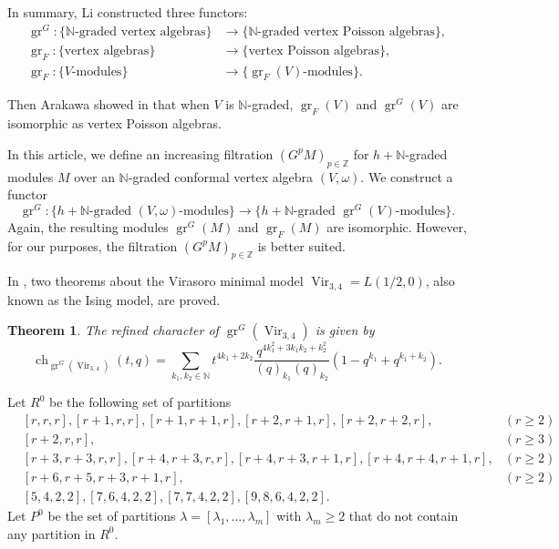 \documentclass[a4paper, 12pt, reqno]{amsart}
\newtheorem{theorem}{Theorem}[section]
\theoremstyle{remark}
\DeclareMathOperator{\Vir}{Vir}
\DeclareMathOperator{\gr}{gr}
\DeclareMathOperator{\ch}{ch}
\begin{document}
In summary, Li constructed three functors:
\begin{align*}
  \gr^G: \{\text{$\mathbb{N}$-graded vertex algebras}\} &\to \{\text{$\mathbb{N}$-graded vertex Poisson algebras}\}, \\
  \gr_F: \{\text{vertex algebras}\} &\to \{\text{vertex Poisson algebras}\}, \\
  \gr_F: \{\text{$V$-modules}\} &\to \{\text{$\gr_F(V)$-modules}\}.
\end{align*}

Then Arakawa showed in \cite[Proposition 2.6.1]{arakawa_remark_2012} that when $V$ is $\mathbb{N}$-graded, $\gr_F(V)$ and $\gr^G(V)$ are isomorphic as vertex Poisson algebras.

In this article, we define an increasing filtration $(G^pM)_{p \in \mathbb{Z}}$ for $h + \mathbb{N}$-graded modules $M$ over an $\mathbb{N}$-graded conformal vertex algebra $(V, \omega)$.
We construct a functor
\begin{equation*}
  \gr^G: \{\text{$h + \mathbb{N}$-graded $(V, \omega)$-modules}\} \to \{\text{$h + \mathbb{N}$-graded $\gr^G(V)$-modules}\}.
\end{equation*}
Again, the resulting modules $\gr^G(M)$ and $\gr_F(M)$ are isomorphic.
However, for our purposes, the filtration $(G^pM)_{p \in \mathbb{Z}}$ is better suited.

In \cite{andrews_singular_2022}, two theorems about the Virasoro minimal model $\Vir_{3, 4} = L(1/2, 0)$, also known as the Ising model, are proved.

\begin{theorem}
  \label{thr:1}
  The refined character of $\gr^G(\Vir_{3,4})$ is given by
  \begin{equation*}
    \ch_{\gr^G(\Vir_{3, 4})}(t, q) = \sum_{k_1, k_2 \in \mathbb{N}}t^{4k_1 + 2k_2}\frac{q^{4k_1^2 + 3k_1k_2 + k_2^2}}{(q)_{k_1}(q)_{k_2}}(1 - q^{k_1} + q^{k_1 + k_2}).
  \end{equation*}
\end{theorem}

Let $R^0$ be the following set of partitions
\begin{align*}
  &[r, r, r], [r + 1, r, r], [r + 1, r + 1, r], [r + 2, r + 1, r], [r + 2, r + 2, r], &(r \ge 2) \\
  &[r + 2, r, r], &(r \ge 3) \\
  &[r + 3, r + 3, r, r], [r + 4, r + 3, r, r],  [r + 4, r + 3, r + 1, r], [r + 4, r + 4, r + 1, r], &(r \ge 2) \\
  &[r + 6, r + 5, r + 3, r + 1, r], &(r \ge 2) \\
  &[5, 4, 2, 2], [7, 6, 4, 2, 2], [7, 7, 4, 2, 2], [9, 8, 6, 4, 2, 2].
\end{align*}
Let $P^0$ be the set of partitions $\lambda = [\lambda_1, \dots, \lambda_m]$ with $\lambda_m \ge 2$ that do not contain any partition in $R^0$.
\end{document}
